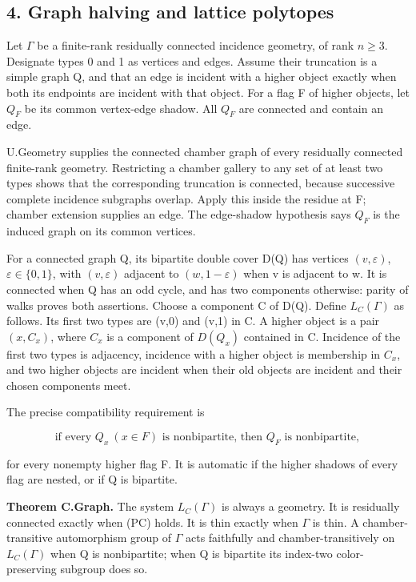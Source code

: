 \documentclass[
  11pt,
  a4paper,
]{article}
\newcounter{none} %
\begin{document}
\subsection{4. Graph halving and lattice
polytopes}\label{graph-halving-and-lattice-polytopes}

Let \(\Gamma\) be a finite-rank residually connected incidence geometry,
of rank \(n\ge 3\). Designate types 0 and 1 as vertices and edges.
Assume their truncation is a simple graph Q, and that an edge is
incident with a higher object exactly when both its endpoints are
incident with that object. For a flag F of higher objects, let \(Q_F\)
be its common vertex-edge shadow. All \(Q_F\) are connected and contain
an edge.

U.Geometry supplies the connected chamber graph of every residually
connected finite-rank geometry. Restricting a chamber gallery to any set
of at least two types shows that the corresponding truncation is
connected, because successive complete incidence subgraphs overlap.
Apply this inside the residue at F; chamber extension supplies an edge.
The edge-shadow hypothesis says \(Q_F\) is the induced graph on its
common vertices.

For a connected graph Q, its bipartite double cover D(Q) has vertices
\((v,\varepsilon )\), \(\varepsilon \in \{0,1\}\), with
\((v,\varepsilon )\) adjacent to \((w,1-\varepsilon )\) when v is
adjacent to w. It is connected when Q has an odd cycle, and has two
components otherwise: parity of walks proves both assertions. Choose a
component C of D(Q). Define \(L_C(\Gamma )\) as follows. Its first two
types are (v,0) and (v,1) in C. A higher object is a pair \((x,C_x)\),
where \(C_x\) is a component of \(D(Q_x)\) contained in C. Incidence of
the first two types is adjacency, incidence with a higher object is
membership in \(C_x\), and two higher objects are incident when their
old objects are incident and their chosen components meet.

The precise compatibility requirement is

\[
\text{if every }Q_x\ (x\in F)\text{ is nonbipartite, then }Q_F
\text{ is nonbipartite},
\tag{PC}
\]

for every nonempty higher flag F. It is automatic if the higher shadows
of every flag are nested, or if Q is bipartite.

\textbf{Theorem C.Graph.} The system \(L_C(\Gamma )\) is always a
geometry. It is residually connected exactly when (PC) holds. It is thin
exactly when \(\Gamma\) is thin. A chamber-transitive automorphism group
of \(\Gamma\) acts faithfully and chamber-transitively on
\(L_C(\Gamma )\) when Q is nonbipartite; when Q is bipartite its
index-two color-preserving subgroup does so.
\end{document}
